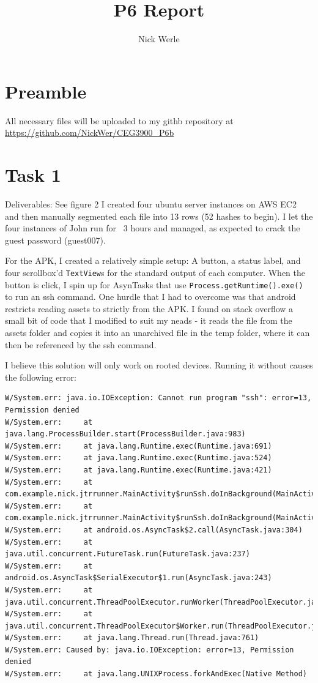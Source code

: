 \documentclass{article}
\title{P6 Report}
\author{Nick Werle}
\begin{document}
\maketitle
\section{Preamble}
All necessary files will be uploaded to my githb repository at \url{https://github.com/NickWer/CEG3900_P6b}

\section{Task 1}
Deliverables: See figure 2
I created four ubuntu server instances on AWS EC2 and then manually segmented each file into 13 rows (52 hashes to begin).
I let the four instances of John run for ~3 hours and managed, as expected to crack the guest password (guest007).

For the APK, I created a relatively simple setup: A button, a status label, and four scrollbox'd \texttt{TextView}s for the standard output of each computer. When the button is click, I spin up for AsynTasks that use \texttt{Process.getRuntime().exe()} to run an ssh command. One hurdle that I had to overcome was that android restricts reading assets to strictly from the APK. I found on stack overflow a small bit of code that I modified to suit my neads - it reads the file from the assets folder and copies it into an unarchived file in the temp folder, where it can then be referenced by the ssh command. 

I believe this solution will only work on rooted devices. Running it without causes the following error:
\begin{verbatim}
W/System.err: java.io.IOException: Cannot run program "ssh": error=13, Permission denied
W/System.err:     at java.lang.ProcessBuilder.start(ProcessBuilder.java:983)
W/System.err:     at java.lang.Runtime.exec(Runtime.java:691)
W/System.err:     at java.lang.Runtime.exec(Runtime.java:524)
W/System.err:     at java.lang.Runtime.exec(Runtime.java:421)
W/System.err:     at com.example.nick.jtrrunner.MainActivity$runSsh.doInBackground(MainActivity.java:74)
W/System.err:     at com.example.nick.jtrrunner.MainActivity$runSsh.doInBackground(MainActivity.java:29)
W/System.err:     at android.os.AsyncTask$2.call(AsyncTask.java:304)
W/System.err:     at java.util.concurrent.FutureTask.run(FutureTask.java:237)
W/System.err:     at android.os.AsyncTask$SerialExecutor$1.run(AsyncTask.java:243)
W/System.err:     at java.util.concurrent.ThreadPoolExecutor.runWorker(ThreadPoolExecutor.java:1133)
W/System.err:     at java.util.concurrent.ThreadPoolExecutor$Worker.run(ThreadPoolExecutor.java:607)
W/System.err:     at java.lang.Thread.run(Thread.java:761)
W/System.err: Caused by: java.io.IOException: error=13, Permission denied
W/System.err:     at java.lang.UNIXProcess.forkAndExec(Native Method)
\end{verbatim}
\end{document}
